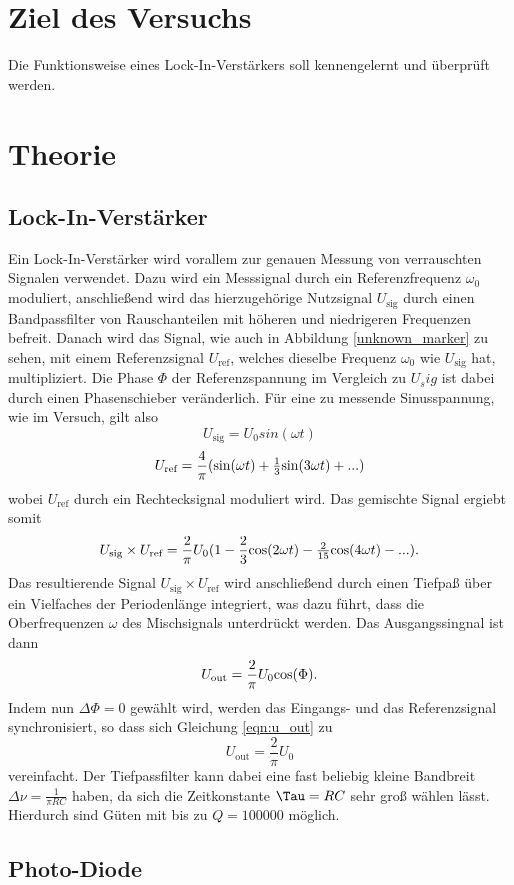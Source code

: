 \section{Ziel des Versuchs}
\label{sec:Ziel des Versuchs}
Die Funktionsweise eines Lock-In-Verstärkers soll kennengelernt und überprüft werden.
\section{Theorie}
\label{sec:Theorie}
\subsection{Lock-In-Verstärker}
    Ein Lock-In-Verstärker wird vorallem zur genauen Messung von verrauschten Signalen verwendet.
    Dazu wird ein Messsignal durch ein Referenzfrequenz $\omega_0$ moduliert, anschließend wird das
    hierzugehörige Nutzsignal $U_\text{sig}$ durch einen Bandpassfilter von Rauschanteilen mit höheren und niedrigeren Frequenzen
    befreit. Danach wird das Signal, wie auch in Abbildung \ref{unknown_marker} zu sehen, mit einem Referenzsignal
    $U_\text{ref}$, welches dieselbe Frequenz $\omega_0$ wie $U_\text{sig}$ hat, multipliziert. Die Phase $\Phi$ der Referenzspannung im Vergleich zu $U_sig$
    ist dabei durch einen Phasenschieber veränderlich. 
    Für eine zu messende Sinusspannung, wie im Versuch, gilt also
    \begin{equation}
        U_\text{sig} = U_0 sin(\omega t)
    \end{equation} 
    \begin{equation}
        U_\text{ref} = \frac {4}{\pi} ($sin$(\omega t) + \frac {1}{3} $sin$(3 \omega t) + ... )
    \end{equation}
    wobei $U_\text{ref}$ durch ein Rechtecksignal moduliert wird. Das gemischte Signal ergiebt somit
    \begin{equation}
        U_\text{sig} \times U_\text{ref} = \frac {2}{\pi} U_0 (1- \frac{2}{3} $cos$(2 \omega t) - \frac {2}{15} $cos$(4 \omega t) - ...).
    \end{equation}
        Das resultierende Signal $U_\text{sig} \times U_\text{ref}$ wird anschließend durch einen Tiefpaß über ein Vielfaches der Periodenlänge
        integriert, was dazu führt, dass die Oberfrequenzen $\omega$ des Mischsignals unterdrückt werden. Das Ausgangssingnal ist dann
        \begin{equation}
        \label{eqn:u_out}
            U_\text{out} = \frac{2}{\pi} U_0 $cos$(\Phi) .
        \end{equation}
        Indem nun $\Delta \Phi = 0$ gewählt wird, werden das Eingangs- und das Referenzsignal synchronisiert, so dass sich Gleichung \ref{eqn:u_out}
        zu
        \begin{equation}
            U_\text{out} = \frac{2}{\pi} U_0
        \end{equation}
        vereinfacht. Der Tiefpassfilter kann dabei eine fast beliebig kleine Bandbreit $\Delta \nu  = \frac{1}{\pi R C}$ haben, da sich die Zeitkonstante $\Tau = R C$ sehr groß wählen lässt.
        Hierdurch sind Güten mit bis zu $Q = 100000$ möglich.
\subsection{Photo-Diode}